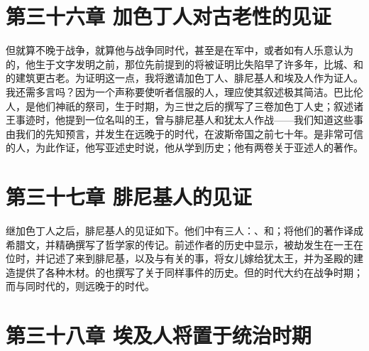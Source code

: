 
\section{第三十六章 加色丁人对古老性的见证}

但就算不晚于战争，就算他与战争同时代，甚至是在军中，或者如有人乐意认为的，他生于文字发明之前，那位先前提到的将被证明比失陷早了许多年，比城、和的建筑更古老。为证明这一点，我将邀请加色丁人、腓尼基人和埃及人作为证人。我还需多言吗？因为一个声称要使听者信服的人，理应使其叙述极其简洁。巴比伦人，是他们神祇的祭司，生于时期，为三世之后的撰写了三卷加色丁人史；叙述诸王事迹时，他提到一位名叫的王，曾与腓尼基人和犹太人作战——我们知道这些事由我们的先知预言，并发生在远晚于的时代，在波斯帝国之前七十年。是非常可信的人，为此作证，他写亚述史时说，他从学到历史；他有两卷关于亚述人的著作。\par


\section{第三十七章 腓尼基人的见证}

继加色丁人之后，腓尼基人的见证如下。他们中有三人：、和；将他们的著作译成希腊文，并精确撰写了哲学家的传记。前述作者的历史中显示，被劫发生在一王在位时，并记述了来到腓尼基，以及与有关的事，将女儿嫁给犹太王，并为圣殿的建造提供了各种木材。的也撰写了关于同样事件的历史。但的时代大约在战争时期；而与同时代的，则远晚于的时代。\par


\section{第三十八章 埃及人将置于统治时期}

